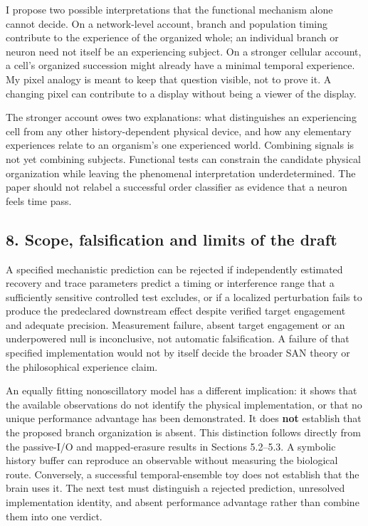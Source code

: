 \documentclass[
  american,
  11pt,
  letterpaper,
]{article}
\begin{document}
I propose two possible interpretations that the functional mechanism alone cannot decide. On a network-level account, branch and population timing contribute to the experience of the organized whole; an individual branch or neuron need not itself be an experiencing subject. On a stronger cellular account, a cell's organized succession might already have a minimal temporal experience. My pixel analogy is meant to keep that question visible, not to prove it. A changing pixel can contribute to a display without being a viewer of the display.

The stronger account owes two explanations: what distinguishes an experiencing cell from any other history-dependent physical device, and how any elementary experiences relate to an organism's one experienced world. Combining signals is not yet combining subjects. Functional tests can constrain the candidate physical organization while leaving the phenomenal interpretation underdetermined. The paper should not relabel a successful order classifier as evidence that a neuron feels time pass.

\subsection{8. Scope, falsification and limits of the draft}\label{scope-falsification-and-limits-of-the-draft}

A specified mechanistic prediction can be rejected if independently estimated recovery and trace parameters predict a timing or interference range that a sufficiently sensitive controlled test excludes, or if a localized perturbation fails to produce the predeclared downstream effect despite verified target engagement and adequate precision. Measurement failure, absent target engagement or an underpowered null is inconclusive, not automatic falsification. A failure of that specified implementation would not by itself decide the broader SAN theory or the philosophical experience claim.

An equally fitting nonoscillatory model has a different implication: it shows that the available observations do not identify the physical implementation, or that no unique performance advantage has been demonstrated. It does \textbf{not} establish that the proposed branch organization is absent. This distinction follows directly from the passive-I/O and mapped-erasure results in Sections 5.2--5.3. A symbolic history buffer can reproduce an observable without measuring the biological route. Conversely, a successful temporal-ensemble toy does not establish that the brain uses it. The next test must distinguish a rejected prediction, unresolved implementation identity, and absent performance advantage rather than combine them into one verdict.
\end{document}
